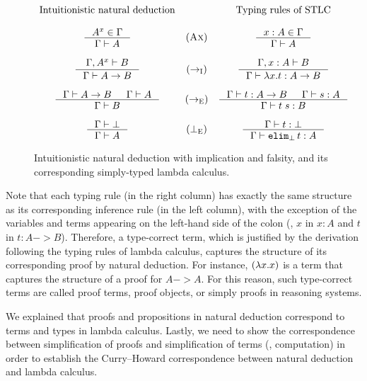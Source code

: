 \begin{figure}
\[
\begin{array}{ccc}
        \text{Intuitionistic natural deduction} & &
        \text{Typing rules of STLC} \\ \\
\inference{A^x \in \Gamma}{\Gamma |- A} & (\textsc{Ax}) &
\inference{x:A \in \Gamma}{\Gamma |- A} \\ \\
\inference{\Gamma,A^x |- B}{\Gamma |- A -> B} & (->_\textsc{I}) &
\inference{\Gamma,x:A |- B}{\Gamma |- \l x.t : A -> B} \\ \\
\inference{\Gamma |- A -> B & \Gamma |- A}{\Gamma |- B} & (->_\textsc{E}) &
\inference{\Gamma |- t : A -> B & \Gamma |- s : A}{\Gamma |- t\;s : B} \\ \\
\inference{\Gamma |- \bot}{\Gamma |- A} & (\bot_\textsc{E})  &
\inference{\Gamma |- t:\bot}{\Gamma |- \texttt{elim}_\bot\,t : A}
\end{array}
\]
\caption{Intuitionistic natural deduction with implication and falsity,
        and its corresponding simply-typed lambda calculus.}
\label{fig:nd}
\end{figure}

Note that each typing rule (in the right column) has exactly the same structure
as its corresponding inference rule (in the left column), with the exception of
the variables and terms appearing on the left-hand side of the colon
(\eg, $x$ in $x:A$ and $t$ in $t:A -> B$). Therefore, a type-correct term,
which is justified by the derivation following the typing rules of
lambda calculus, captures the structure of its corresponding proof
by natural deduction. For instance, $(\lambda x. x)$ is a term that captures
the structure of a proof for $A -> A$. For this reason, such type-correct terms
are called proof terms, proof objects, or simply proofs in reasoning systems.

We explained that proofs and propositions in natural deduction
correspond to terms and types in lambda calculus. Lastly,
we need to show the correspondence between simplification of proofs
and simplification of terms (\ie, computation) in order to establish
the Curry--Howard correspondence between natural deduction
and lambda calculus.

